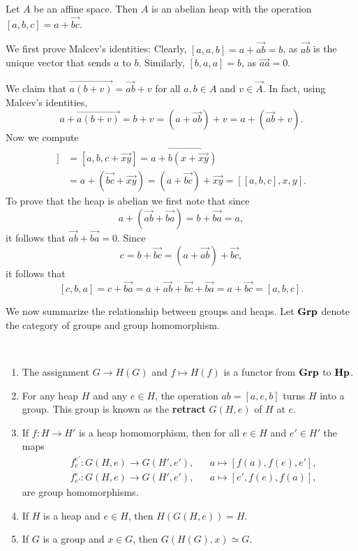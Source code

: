 \documentclass{svmult}
\newcommand{\category}[1]{{\normalfont\textbf{#1}}}
\newcommand{\Grp}{\category{Grp}}
\newcommand{\Hp}{\category{Hp}}
\begin{document}
\begin{example}
    Let $A$ be an affine space. Then $A$ is an abelian 
    heap with the operation $[a,b,c]=a+\overrightarrow{bc}$. 
    
    We first prove Malcev's identities:
    Clearly, $[a,a,b]=a+\overrightarrow{ab}=b$, as $\overrightarrow{ab}$ is the unique
    vector that sends $a$ to $b$. Similarly, $[b,a,a]=b$, as $\overrightarrow{aa}=0$. 
    
    We claim that
    $\overrightarrow{a(b+v)}=\overrightarrow{ab}+v$ for all $a,b\in A$ and $v\in\overrightarrow{A}$. 
    In fact, using Malcev's identities, 
    \[
    a+\overrightarrow{a(b+v)}=b+v=\left(a+\overrightarrow{ab}\right)+v=a+\left(\overrightarrow{ab}+v\right).
    \]
    Now we compute
    \begin{align*}
        [a,b,[c,x,y]] &= \left[a,b,c+\overrightarrow{xy}\right]
        =a+\overrightarrow{b\left(x+\overrightarrow{xy}\right)}\\
        &=a+\left(\overrightarrow{bc}+\overrightarrow{xy}\right)
        =\left(a+\overrightarrow{bc}\right)+\overrightarrow{xy}
        =[[a,b,c],x,y].
    \end{align*}
    To prove that the heap is abelian we first note that since 
    \[
    a+\left(\overrightarrow{ab}+\overrightarrow{ba}\right)=b+\overrightarrow{ba}=a,
    \]
    it follows that $\overrightarrow{ab}+\overrightarrow{ba}=0$. Since
    \[
    c=b+\overrightarrow{bc}=\left(a+\overrightarrow{ab}\right)+\overrightarrow{bc},
    \]
    it follows that 
    \[
    [c,b,a]=c+\overrightarrow{ba}=a+\overrightarrow{ab}+\overrightarrow{bc}+\overrightarrow{ba}
    =a+\overrightarrow{bc}
    =[a,b,c].
    \]
\end{example}

We now summarize the relationship between groups and heaps. Let $\Grp$ denote 
the category of groups and group homomorphism. 

\begin{theorem}\
\label{thm:heaps_and_groups}
\begin{enumerate}
    \item The assignment $G\to H(G)$ and $f\mapsto H(f)$ is a functor from $\Grp$ to $\Hp$.
    \item For any heap $H$ and any $e\in H$, the operation $ab=[a,e,b]$ turns $H$ into a group. 
    This group is known as the \textbf{retract} 
    $G(H,e)$ of $H$ at $e$. 
    \item If $f\colon H\to H'$ is a heap homomorphism, then for all $e\in H$ and $e'\in H'$
    the maps
    \begin{align*}
        &f_e^{e'}\colon G(H,e)\to G(H',e'),&&a\mapsto [f(a),f(e),e'],\\
        &f_{e'}^{e}\colon G(H,e)\to G(H',e'),&&a\mapsto [e',f(e),f(a)],
    \end{align*}
    are group homomorphisms. 
    \item If $H$ is a heap and $e\in H$, then $H(G(H,e))=H$.
    \item If $G$ is a group and $x\in G$, then $G(H(G),x)\simeq G$. 
\end{enumerate}
\end{theorem}
\end{document}
